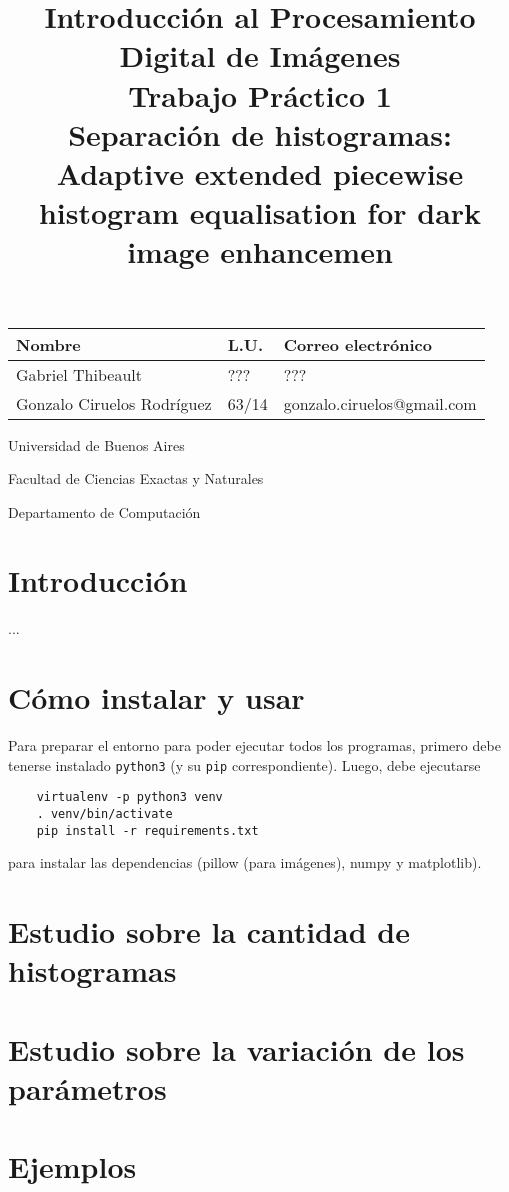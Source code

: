 \documentclass[11pt, spanish]{article}
\title{Introducción al Procesamiento Digital de Imágenes\\
Trabajo Práctico 1 \\
\large Separación de histogramas: \\
Adaptive extended piecewise histogram equalisation for dark image
enhancemen}
\date{}
\author{}
\begin{document}
\maketitle
\begin{center}
\begin{large}
\begin{tabular}{|l|l|l|}
 \hline
 \textbf{Nombre} & \textbf{L.U.} & \textbf{Correo electrónico} \\
 \hline
 Gabriel Thibeault & ??? & ??? \\
 \hline
 Gonzalo Ciruelos Rodríguez & 63/14 & gonzalo.ciruelos@gmail.com \\
 \hline
\end{tabular}
\end{large}
\end{center}

\vspace{10cm}

\large{
Universidad de Buenos Aires

Facultad de Ciencias Exactas y Naturales

Departamento de Computación
}
\newpage

\section{Introducción}
...

\section{Cómo instalar y usar}
Para preparar el entorno para poder ejecutar todos los programas,
primero debe tenerse instalado \texttt{python3} (y su \texttt{pip} correspondiente).
Luego, debe ejecutarse 
\begin{verbatim}
    virtualenv -p python3 venv 
    . venv/bin/activate
    pip install -r requirements.txt 
\end{verbatim}
\noindent para instalar las dependencias (pillow (para imágenes), numpy y matplotlib).
\newpage

\section{Estudio sobre la cantidad de histogramas}

\newpage

\section{Estudio sobre la variación de los parámetros}

\newpage

\section{Ejemplos}

\end{document}
